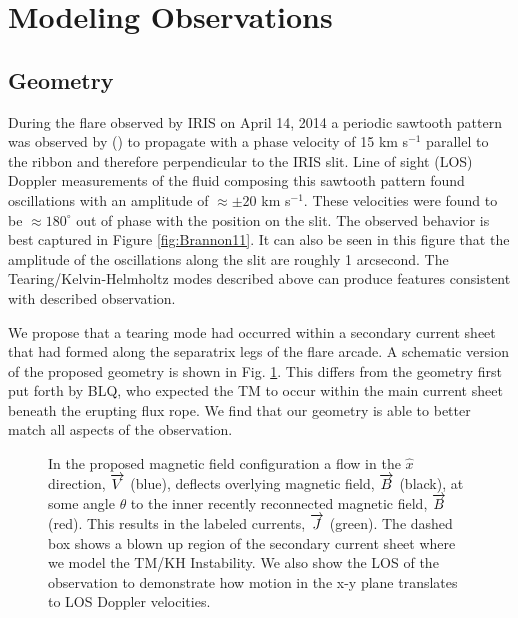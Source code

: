 	

\section{Modeling Observations}

\subsection{Geometry}
	During the flare observed by IRIS on April 14, 2014 a periodic sawtooth pattern was observed by \citet{Brannon2015} (\BLQ) to propagate with a phase velocity of 15 km s$^{-1}$ parallel to the ribbon and therefore perpendicular to the IRIS slit.  Line of sight (LOS) Doppler measurements of the fluid composing this sawtooth pattern found oscillations with an amplitude of $\approx \pm20$ km s$^{-1}$.  These velocities were found to be $\approx 180^{\circ}$ out of phase with the position on the slit. The observed behavior is best captured in Figure \ref{fig:Brannon11}.  It can also be seen in this figure that the amplitude of the oscillations along the slit are roughly 1 arcsecond. The Tearing/Kelvin-Helmholtz modes described above can produce features consistent with described observation. 
	
	We propose that a tearing mode had occurred within a secondary current sheet that had formed along the separatrix legs of the flare arcade.  A schematic version of the proposed geometry is shown in Fig. \ref{fig:cartoon}.  This differs from the geometry first put forth by BLQ, who expected the TM to occur within the main current sheet beneath the erupting flux rope.  We find that our geometry is able to better match all aspects of the observation.      
		
	\begin{figure}[htbp]	
	

	\centerline{} 
	\caption{In the proposed magnetic field configuration a flow in the $\hat{x}$ direction, $\protect\overrightarrow{V}$ (blue), deflects overlying magnetic field, $\protect\overrightarrow{B}$ (black), at some angle $\theta$ to the inner recently reconnected magnetic field, $\protect\overrightarrow{B}$ (red).  This results in the labeled currents, $\protect\overrightarrow{J}$ (green).  The dashed box shows a blown up region of the secondary current sheet where we model the TM/KH Instability.  We also show the LOS of the observation to demonstrate how motion in the x-y plane translates to LOS Doppler velocities.}
	\label{fig:cartoon}

	\end{figure}
	
